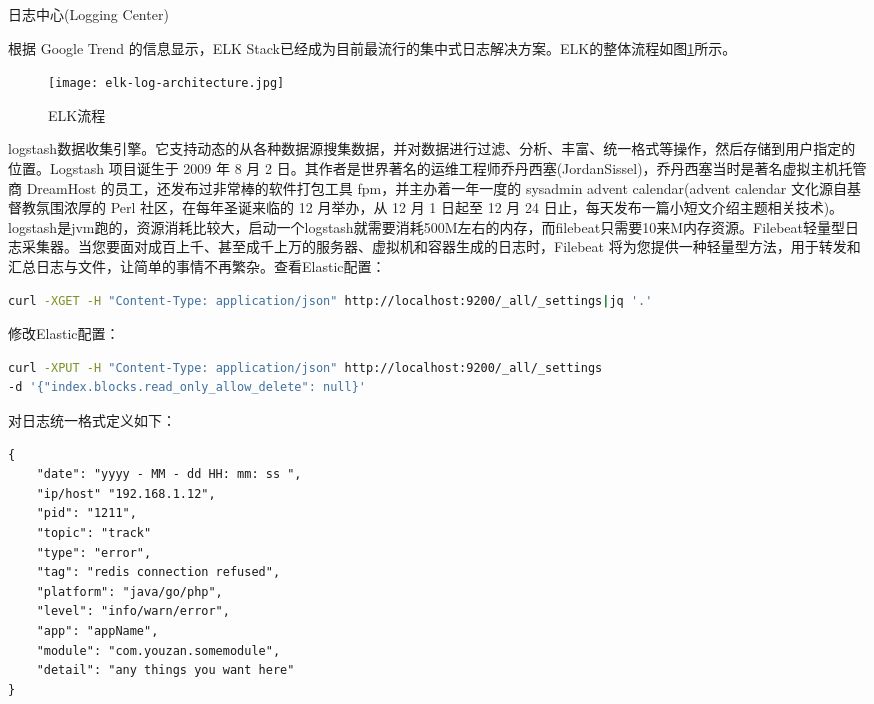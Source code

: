\documentclass[8pt]{book}
\makeatletter
\numberwithin{dummy}{section}
\theoremstyle{ocrenumbox}
\theoremstyle{blacknumex}
\theoremstyle{blacknumbox}
\theoremstyle{ocrenum}
\renewcommand{\section}{\@startsection{section}{1}{\z@}
	{-4ex \@plus -1ex \@minus -.4ex}
	{1ex \@plus.2ex }
	{\normalfont\large\sffamily\bfseries}}
\makeatother
\begin{document}
\section{日志中心(Logging Center)}

根据 Google Trend 的信息显示，ELK Stack已经成为目前最流行的集中式日志解决方案。ELK的整体流程如图\ref{fig:elklogarchitecture}所示。




\begin{figure}[htbp]
	\centering
	\texttt{[image: elk-log-architecture.jpg]}
	\caption{ELK流程}
	\label{fig:elklogarchitecture}
\end{figure}
logstash数据收集引擎。它支持动态的从各种数据源搜集数据，并对数据进行过滤、分析、丰富、统一格式等操作，然后存储到用户指定的位置。Logstash 项目诞生于 2009 年 8 月 2 日。其作者是世界著名的运维工程师乔丹西塞(JordanSissel)，乔丹西塞当时是著名虚拟主机托管商 DreamHost 的员工，还发布过非常棒的软件打包工具 fpm，并主办着一年一度的 sysadmin advent calendar(advent calendar 文化源自基督教氛围浓厚的 Perl 社区，在每年圣诞来临的 12 月举办，从 12 月 1 日起至 12 月 24 日止，每天发布一篇小短文介绍主题相关技术)。logstash是jvm跑的，资源消耗比较大，启动一个logstash就需要消耗500M左右的内存，而filebeat只需要10来M内存资源。Filebeat轻量型日志采集器。当您要面对成百上千、甚至成千上万的服务器、虚拟机和容器生成的日志时，Filebeat 将为您提供一种轻量型方法，用于转发和汇总日志与文件，让简单的事情不再繁杂。查看Elastic配置：

\begin{lstlisting}[language=Bash]
curl -XGET -H "Content-Type: application/json" http://localhost:9200/_all/_settings|jq '.'
\end{lstlisting}

修改Elastic配置：

\begin{lstlisting}[language=Bash]
curl -XPUT -H "Content-Type: application/json" http://localhost:9200/_all/_settings 
-d '{"index.blocks.read_only_allow_delete": null}'
\end{lstlisting}

对日志统一格式定义如下：


\begin{lstlisting}
{
	"date": "yyyy - MM - dd HH: mm: ss ",
	"ip/host" "192.168.1.12",
	"pid": "1211",
	"topic": "track"
	"type": "error",
	"tag": "redis connection refused",
	"platform": "java/go/php",
	"level": "info/warn/error",
	"app": "appName",
	"module": "com.youzan.somemodule",
	"detail": "any things you want here"
}
\end{lstlisting}
\end{document}
